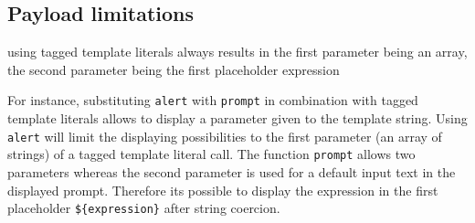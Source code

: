 \subsection{Payload limitations}
using tagged template literals always results in the first parameter being an array, the second parameter being the first placeholder expression

For instance, substituting \verb|alert| with \verb|prompt| in combination with tagged template literals allows to display a parameter given to the template string. Using \verb|alert| will limit the displaying possibilities to the first parameter (an array of strings) of a tagged template literal call. The function \verb|prompt| allows two parameters whereas the second parameter is used for a default input text in the displayed prompt. \cite{js/prompt} Therefore its possible to display the expression in the first placeholder \verb|${expression}| after string coercion.
